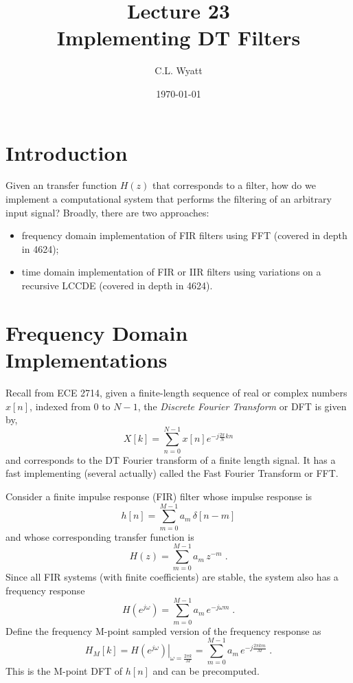 \documentclass{article}
\begin{document}
\title{Lecture 23\\Implementing DT Filters}
\author{C.L. Wyatt}
\date{\today}
\maketitle

\section{Introduction}

Given an transfer function $H(z)$ that corresponds to a filter, how do we implement a computational system that performs the filtering of an arbitrary input signal? Broadly, there are two approaches:

\begin{itemize}
\item frequency domain implementation of FIR filters using FFT (covered in depth in 4624);
\item time domain implementation of FIR or IIR filters using variations on a recursive LCCDE (covered in depth in 4624).
\end{itemize}

\section{Frequency Domain Implementations}

Recall from ECE 2714, given a finite-length sequence of real or complex numbers $x[n]$, indexed from $0$ to $N-1$, the \emph{Discrete Fourier Transform} or DFT is given by,
\[
X[k] = \sum_{n = 0}^{N-1}  x[n] e^{-j \frac{2\pi}{N}k n}
\]
and corresponds to the DT Fourier transform of a finite length signal. It has a fast implementing (several actually) called the Fast Fourier Transform or FFT.

Consider a finite impulse response (FIR) filter whose impulse response is
\[
h[n] = \sum\limits_{m = 0}^{M-1} a_m\, \delta[n-m]
\]
and whose corresponding transfer function is
\[
H(z) = \sum\limits_{m = 0}^{M-1} a_m\, z^{-m} \; .
\]
Since all FIR systems (with finite coefficients) are stable, the system also has a frequency response
\[
H\left(e^{j\omega}\right) = \sum\limits_{m = 0}^{M-1} a_m\, e^{-j\omega m} \; .
\]
Define the frequency M-point sampled version of the frequency response as
\[
H_M[k] = \left. H\left(e^{j\omega}\right) \right|_{\omega = \frac{2\pi k}{M}} = \sum\limits_{m = 0}^{M-1} a_m\, e^{-j\frac{2\pi k m}{M}} \; .
\]
This is the M-point DFT of $h[n]$ and can be precomputed.
\end{document}

